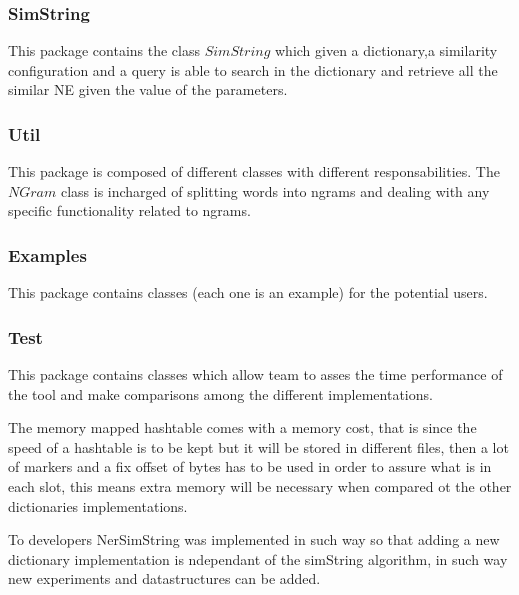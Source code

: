 \subsubsection*{SimString}
This package contains the class $SimString$ which given a dictionary,a similarity configuration  and a query
is able to search in the dictionary and retrieve all the similar NE given the value of the parameters.


\subsubsection*{Util}
This package is composed of different classes with different responsabilities.
The $NGram$ class is incharged of splitting words into ngrams and dealing with any specific functionality related to ngrams.

\subsubsection*{Examples}
This package contains classes (each one is an example) for the potential users.

\subsubsection*{Test}
This package contains classes which allow team to asses the time performance of the tool and make comparisons among the different implementations.





The memory mapped hashtable comes with a memory cost, that is since the speed of  a hashtable is to be kept but it will be stored in different files, then a lot of markers and a fix offset of bytes has to be used in order to assure what is in each slot, this means extra memory will be necessary when compared ot the other dictionaries implementations.

To developers NerSimString was implemented in such way so that adding a new dictionary implementation is ndependant of the simString algorithm, in such way new experiments and datastructures can be added.



